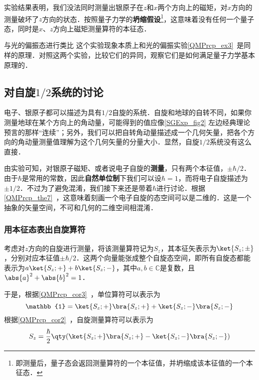 实验结果表明，我们没法同时测量出银原子在$z$和$x$两个方向上的磁矩，对$x$方向的测量破坏了$z$方向的状态．按照量子力学的\textbf{坍缩假设}\footnote{即测量后，量子态会返回测量算符的一个本征值，并坍缩成该本征值的一个本征态．}，这意味着没有任何一个量子态，同时是$x$、$z$方向上磁矩测量算符的本征态．



\begin{exercise}{与光的偏振态进行类比}
这个实验现象本质上和光的偏振实验\autoref{QMPrcp_ex3}~是同样的原理．对照这两个实验，比较它们的异同，观察它们是如何满足量子力学基本原理的．
\end{exercise}






\subsection{对自旋$1/2$系统的讨论}

电子、银原子都可以描述为具有$1/2$自旋的系统．自旋和地球的自转不同，如果你测量地球在某个方向上的角动量，可能得到的值应像\autoref{SGExp_fig2} 左边经典理论预言的那样“连续”；另外，我们可以把自转角动量描述成一个几何矢量，把各个方向的角动量测量值理解为这个几何矢量的分量大小．显然，自旋$1/2$系统没有这么直接．

由实验可知，对银原子磁矩、或者说电子自旋的\textbf{测量}，只有两个本征值，$\pm\hbar/2$．由于$\hbar$是常用的常数，因此\textbf{自然单位制}下我们可以设$\hbar=1$，而将电子自旋描述为$\pm 1/2$．不过为了避免混淆，我们接下来还是带着$\hbar$进行讨论．根据\autoref{QMPrcp_the7}~，这意味着刻画一个电子自旋的态空间可以是二维的．这是一个抽象的矢量空间，不可和几何的二维空间相混淆．

\subsubsection{用本征态表出自旋算符}

考虑对$z$方向的自旋进行测量，将该测量算符记为$S_z$，其本征矢表示为$\ket{S_z; \pm}$，分别对应本征值$\pm \hbar/2$．这两个向量能张成整个自旋态空间，即所有自旋态都能表示为$a\ket{S_z; +}+b\ket{S_z; -}$，其中$a, b\in\mathbb{C}$是复数，且$\abs{a}^2+\abs{b}^2=1$．

于是，根据\autoref{QMPrcp_cor3}~，单位算符可以表示为
\begin{equation}
\mathbb{1}=\ket{S_z; +}\bra{S_z; +} + \ket{S_z; -}\bra{S_z; -}
\end{equation}
根据\autoref{QMPrcp_cor2}~，自旋测量算符可以表示为
\begin{equation}
S_z=\frac{\hbar}{2}\qty(\ket{S_z; +}\bra{S_z; +} - \ket{S_z; -}\bra{S_z; -})
\end{equation}

